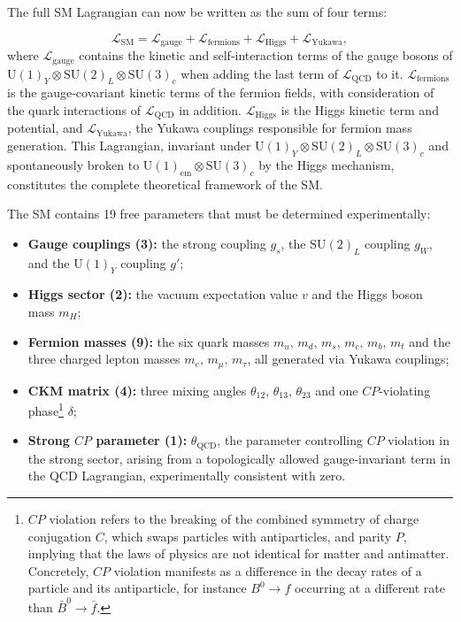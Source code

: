 The full SM Lagrangian can now be written as the sum of four terms:

\begin{equation}
    \mathcal{L}_{\mathrm{SM}} = 
    \mathcal{L}_{\mathrm{gauge}}
    + \mathcal{L}_{\mathrm{fermions}}
    + \mathcal{L}_{\mathrm{Higgs}}
    + \mathcal{L}_{\mathrm{Yukawa}},
\end{equation}
where $\mathcal{L}_{\mathrm{gauge}}$ contains the kinetic and self-interaction terms of the gauge bosons of $\mathrm{U}(1)_Y \otimes \mathrm{SU}(2)_L \otimes \mathrm{SU}(3)_c$ when adding the last term of $\mathcal{L}_\mathrm{QCD}$ to it. $\mathcal{L}_{\mathrm{fermions}}$ is the gauge-covariant kinetic terms of the fermion fields, with consideration of the quark interactions of $\mathcal{L}_\mathrm{QCD}$ in addition. $\mathcal{L}_{\mathrm{Higgs}}$ is the Higgs kinetic term and potential, and $\mathcal{L}_{\mathrm{Yukawa}}$, the Yukawa couplings responsible for fermion mass generation. This Lagrangian, invariant under $\mathrm{U}(1)_Y \otimes \mathrm{SU}(2)_L \otimes \mathrm{SU}(3)_c$ and spontaneously broken to $\mathrm{U}(1)_{\mathrm{em}} \otimes \mathrm{SU}(3)_c$ by the Higgs mechanism, constitutes the complete theoretical framework of the SM.

\vspace{0.5 cm}

The SM contains 19 free parameters that must be determined experimentally:
\begin{itemize}
    \item \textbf{Gauge couplings (3):} the strong coupling $g_s$, the $\mathrm{SU}(2)_L$     coupling $g_W$, and the $\mathrm{U}(1)_Y$ coupling $g'$;
    \item \textbf{Higgs sector (2):} the vacuum expectation value $v$ and the Higgs boson mass $m_H$;
    \item \textbf{Fermion masses (9):} the six quark masses $m_u,\, m_d,\, m_s,\, m_c,\, m_b,\, m_t$ and the three charged lepton masses $m_e,\, m_\mu,\, m_\tau$, all generated via Yukawa couplings;
    \item \textbf{CKM matrix (4):} three mixing angles $\theta_{12},\, \theta_{13},\, \theta_{23}$ and one $CP$-violating phase\footnote{$CP$ violation refers to the breaking of the combined symmetry of charge conjugation $C$, which swaps particles with antiparticles, and parity $P$, implying that the laws of physics are not identical for matter and antimatter. Concretely, $CP$ violation manifests as a difference in the decay rates of a particle and its antiparticle, for instance $B^0 \to f$ occurring at a different rate than $\bar{B}^0 \to \bar{f}$.} $\delta$;
    \item \textbf{Strong $CP$ parameter (1):} $\theta_{\mathrm{QCD}}$, the parameter controlling $CP$ violation in the strong sector, arising from a topologically allowed gauge-invariant term in the QCD Lagrangian, experimentally consistent with zero.
\end{itemize}

